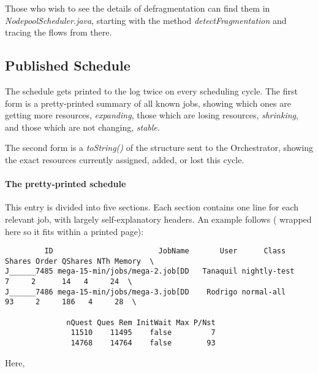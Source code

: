     Those who wish to see the details of defragmentation can find them in
    {\em NodepoolScheduler.java}, starting with the method {\em detectFragmentation}
    and tracing the flows from there.

\subsection{Published Schedule}

   The schedule gets printed to the log twice on every scheduling cycle.  The first
   form is a pretty-printed summary of all known jobs, showing which ones are
   getting more resources, {\em expanding}, those which are losing resources, 
   {\em shrinking}, and those which are not changing, {\em stable.}

   The second form is a {\em toString()} of the structure sent to the Orchestrator,
   showing the exact resources currently assigned, added, or lost this cycle.

   \paragraph{The pretty-printed schedule}
      This entry is divided into five sections.  Each section contains one line for
      each relevant job, with largely self-explanatory headers. An example follows (
      wrapped here so it fits within a printed page):
\begin{verbatim}
         ID                        JobName       User      Class   Shares Order QShares NTh Memory  \
J______7485 mega-15-min/jobs/mega-2.job[DD   Tanaquil nightly-test      7     2      14   4     24  \
J______7486 mega-15-min/jobs/mega-3.job[DD    Rodrigo normal-all       93     2     186   4     28  \

              nQuest Ques Rem InitWait Max P/Nst
               11510    11495    false         7
               14768    14764    false        93

\end{verbatim}
     Here,

